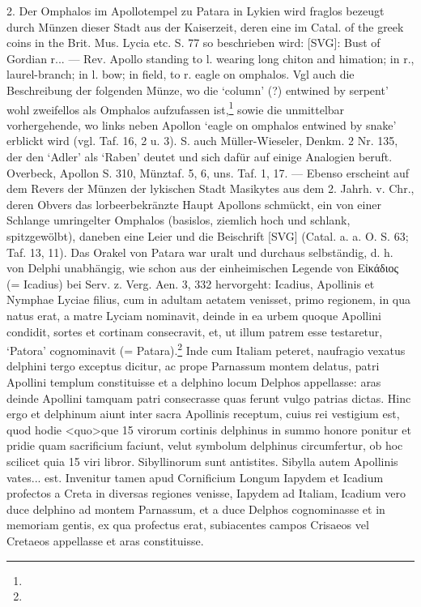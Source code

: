 \documentclass[a4paper, 11pt, oneside]{article}
\begin{document}
2. Der Omphalos im Apollotempel zu Patara in Lykien wird fraglos bezeugt durch Münzen dieser Stadt aus der Kaiserzeit, deren eine im Catal. of the greek coins in the Brit. Mus. Lycia etc. S. 77 so beschrieben wird: [SVG]: Bust of Gordian r... --- Rev. Apollo standing to l. wearing long chiton and himation; in r., laurel-branch; in l. bow; in field, to r. eagle on omphalos. Vgl auch die Beschreibung der folgenden Münze, wo die `column' (?) entwined by serpent' wohl zweifellos als Omphalos aufzufassen ist,\footnote{} sowie die unmittelbar vorhergehende, wo links neben Apollon `eagle on omphalos entwined by snake' erblickt wird (vgl. Taf. 16, 2 u. 3). S. auch Müller-Wieseler, Denkm. 2 Nr. 135, der den `Adler' als `Raben' deutet und sich dafür auf einige Analogien beruft. Overbeck, Apollon S. 310, Münztaf. 5, 6, uns. Taf. 1, 17. --- Ebenso erscheint auf dem Revers der Münzen der lykischen Stadt Masikytes aus dem 2. Jahrh. v. Chr., deren Obvers das lorbeerbekränzte Haupt Apollons schmückt, ein von einer Schlange umringelter Omphalos (basislos, ziemlich hoch und schlank, spitzgewölbt), daneben eine Leier und die Beischrift [SVG] (Catal. a. a. O. S. 63; Taf. 13, 11). Das Orakel von Patara war uralt und durchaus selbständig, d. h. von Delphi unabhängig, wie schon aus der einheimischen Legende von Εἰκάδιος (= Icadius) bei Serv. z. Verg. Aen. 3, 332 hervorgeht: Icadius, Apollinis et Nymphae Lyciae filius, cum in adultam aetatem venisset, primo regionem, in qua natus erat, a matre Lyciam nominavit, deinde in ea urbem quoque Apollini condidit, sortes et cortinam consecravit, et, ut illum patrem esse testaretur, `Patora' cognominavit (= Patara).\footnote{} Inde cum Italiam peteret, naufragio vexatus delphini tergo exceptus dicitur, ac prope Parnassum montem delatus, patri Apollini templum constituisse et a delphino locum Delphos appellasse: aras deinde Apollini tamquam patri consecrasse quas ferunt vulgo patrias dictas. Hinc ergo et delphinum aiunt inter sacra Apollinis receptum, cuius rei vestigium est, quod hodie <quo>que 15 virorum cortinis delphinus in summo honore ponitur et pridie quam sacrificium faciunt, velut symbolum delphinus circumfertur, ob hoc scilicet quia 15 viri libror. Sibyllinorum sunt antistites. Sibylla autem Apollinis vates... est. Invenitur tamen apud Cornificium Longum Iapydem et Icadium profectos a Creta in diversas regiones venisse, Iapydem ad Italiam, Icadium vero duce delphino ad montem Parnassum, et a duce Delphos cognominasse et in memoriam gentis, ex qua profectus erat, subiacentes campos Crisaeos vel Cretaeos appellasse et aras constituisse.
\end{document}
